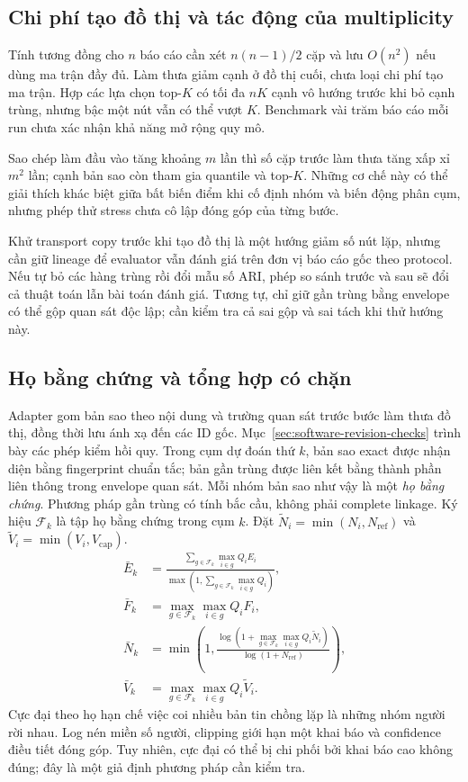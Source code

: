 \subsection{Chi phí tạo đồ thị và tác động của multiplicity}
Tính tương đồng cho $n$ báo cáo cần xét $n(n-1)/2$ cặp và lưu $O(n^2)$ nếu dùng ma trận đầy đủ. Làm thưa giảm cạnh ở đồ thị cuối, chưa loại chi phí tạo ma trận. Hợp các lựa chọn top-$K$ có tối đa $nK$ cạnh vô hướng trước khi bỏ cạnh trùng, nhưng bậc một nút vẫn có thể vượt $K$. Benchmark vài trăm báo cáo mỗi run chưa xác nhận khả năng mở rộng quy mô.

Sao chép làm đầu vào tăng khoảng $m$ lần thì số cặp trước làm thưa tăng xấp xỉ $m^2$ lần; cạnh bản sao còn tham gia quantile và top-$K$. Những cơ chế này có thể giải thích khác biệt giữa bất biến điểm khi cố định nhóm và biến động phân cụm, nhưng phép thử stress chưa cô lập đóng góp của từng bước.

Khử transport copy trước khi tạo đồ thị là một hướng giảm số nút lặp, nhưng cần giữ lineage để evaluator vẫn đánh giá trên đơn vị báo cáo gốc theo protocol. Nếu tự bỏ các hàng trùng rồi đổi mẫu số ARI, phép so sánh trước và sau sẽ đổi cả thuật toán lẫn bài toán đánh giá. Tương tự, chỉ giữ gần trùng bằng envelope có thể gộp quan sát độc lập; cần kiểm tra cả sai gộp và sai tách khi thử hướng này.

\subsection{Họ bằng chứng và tổng hợp có chặn}\label{sec:02-evidence-family}
Adapter gom bản sao theo nội dung và trường quan sát trước bước làm thưa đồ thị, đồng thời lưu ánh xạ đến các ID gốc. Mục~\ref{sec:software-revision-checks} trình bày các phép kiểm hồi quy.
Trong cụm dự đoán thứ $k$, bản sao exact được nhận diện bằng fingerprint chuẩn tắc; bản gần trùng được liên kết bằng thành phần liên thông trong envelope quan sát. Mỗi nhóm bản sao như vậy là một \emph{họ bằng chứng}. Phương pháp gần trùng có tính bắc cầu, không phải complete linkage. Ký hiệu $\mathcal F_k$ là tập họ bằng chứng trong cụm $k$. Đặt $\widetilde N_i=\min(N_i,N_{\mathrm{ref}})$ và $\widetilde V_i=\min(V_i,V_{\mathrm{cap}})$.
\begin{align}
 \bar E_k&=\frac{\sum_{g\in\mathcal F_k}\max_{i\in g}Q_iE_i}
                    {\max(1,\sum_{g\in\mathcal F_k}\max_{i\in g}Q_i)},\label{eq:aggregate-e}\\
 \bar F_k&=\max_{g\in\mathcal F_k}\max_{i\in g}Q_iF_i,\label{eq:aggregate-f}\\
 \bar N_k&=\min\!\left(1,\frac{\log(1+\max_{g\in\mathcal F_k}\max_{i\in g}Q_i\widetilde N_i)}{\log(1+N_{\mathrm{ref}})}\right),\label{eq:aggregate-n}\\
 \bar V_k&=\max_{g\in\mathcal F_k}\max_{i\in g}Q_i\widetilde V_i.\label{eq:aggregate-v}
\end{align}
Cực đại theo họ hạn chế việc coi nhiều bản tin chồng lặp là những nhóm người rời nhau. Log nén miền số người, clipping giới hạn một khai báo và confidence điều tiết đóng góp. Tuy nhiên, cực đại có thể bị chi phối bởi khai báo cao không đúng; đây là một giả định phương pháp cần kiểm tra.

